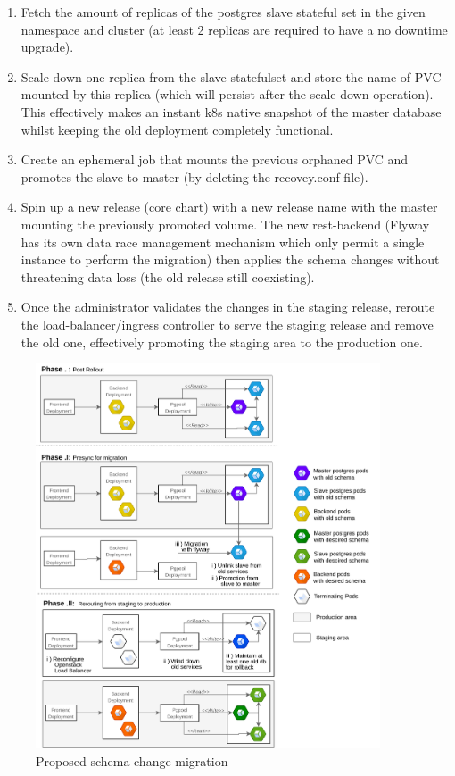 \documentclass[11pt]{article}
\begin{document}
\begin{enumerate}
    \item Fetch the amount of replicas of the postgres slave stateful set in the given namespace and cluster (at least 2 replicas are required to have a no downtime upgrade).
    \item Scale down one replica from the slave statefulset and store the name of PVC mounted by this replica (which will persist after the scale down operation). This effectively makes an instant k8s native snapshot of the master database whilst keeping the old deployment completely functional. 
    \item Create an ephemeral job that mounts the previous orphaned PVC and promotes the slave to master (by deleting the recovey.conf file).
    \item Spin up a new release (core chart) with a new release name with the master mounting the previously promoted volume. The new rest-backend (Flyway has its own data race management mechanism which only permit a single instance to perform the migration) then applies the schema changes without threatening data loss (the old release still coexisting).
    \item Once the administrator validates the changes in the staging release, reroute the load-balancer/ingress controller to serve the staging release and remove the old one, effectively promoting the staging area to the production one. 
\end{enumerate}

\begin{figure}[!h]
    \centering
    \includegraphics[width=0.91\textwidth]{vulas_database_change.png}
    \caption{Proposed schema change migration}
    \label{fig:vulas_db_change}
\end{figure}
\end{document}
